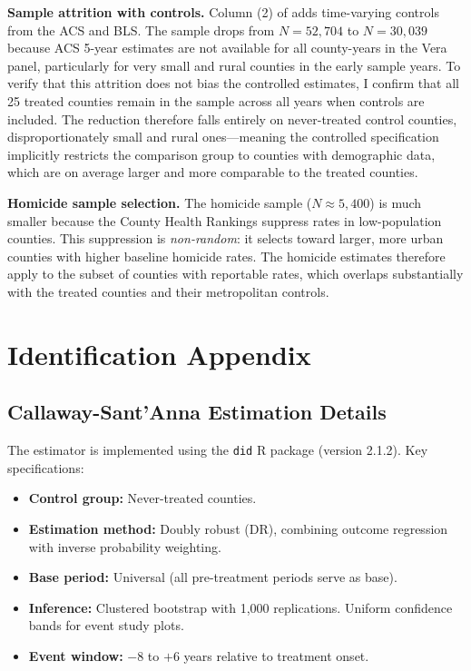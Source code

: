 \documentclass[12pt]{article}
\begin{document}
\textbf{Sample attrition with controls.} Column (2) of  adds time-varying controls from the ACS and BLS. The sample drops from $N = 52{,}704$ to $N = 30{,}039$ because ACS 5-year estimates are not available for all county-years in the Vera panel, particularly for very small and rural counties in the early sample years. To verify that this attrition does not bias the controlled estimates, I confirm that all 25 treated counties remain in the sample across all years when controls are included. The reduction therefore falls entirely on never-treated control counties, disproportionately small and rural ones---meaning the controlled specification implicitly restricts the comparison group to counties with demographic data, which are on average larger and more comparable to the treated counties.

\textbf{Homicide sample selection.} The homicide sample ($N \approx 5{,}400$) is much smaller because the County Health Rankings suppress rates in low-population counties. This suppression is \textit{non-random}: it selects toward larger, more urban counties with higher baseline homicide rates. The homicide estimates therefore apply to the subset of counties with reportable rates, which overlaps substantially with the treated counties and their metropolitan controls.

\section{Identification Appendix}

\subsection{Callaway-Sant'Anna Estimation Details}

The \citet{callaway2021did} estimator is implemented using the \texttt{did} R package (version 2.1.2). Key specifications:
\begin{itemize}
\item \textbf{Control group:} Never-treated counties.
\item \textbf{Estimation method:} Doubly robust (DR), combining outcome regression with inverse probability weighting.
\item \textbf{Base period:} Universal (all pre-treatment periods serve as base).
\item \textbf{Inference:} Clustered bootstrap with 1,000 replications. Uniform confidence bands for event study plots.
\item \textbf{Event window:} $-8$ to $+6$ years relative to treatment onset.
\end{itemize}
\end{document}
